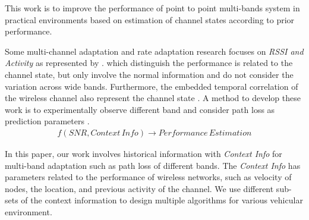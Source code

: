 

	  This work is to improve the performance of point to point multi-bands system in practical environments based on estimation of channel states according to prior performance.


	  Some multi-channel adaptation and rate adaptation research focuses on \emph{RSSI and Activity} as represented by \cite{cordeiro2007c,MOAR}. 
	  which distinguish the performance is related to the channel state, but only involve the normal information and do not consider the variation across wide bands. 
	  Furthermore, the embedded temporal correlation of the wireless channel also represent the channel state \cite{liuastra}. 
	  A method to develop these work is to experimentally observe different band and consider path loss as prediction parameters \cite{yucek2009survey}.
	  \begin{align}
	  \label{euqation:performance estimation}
	  f(SNR,Context\, Info) \rightarrow Performance\, Estimation
	  \end{align}

	  In this paper, our work involves historical information with \emph{Context Info} for multi-band adaptation such as path loss of different bands.
	  The \emph{Context Info} has parameters related to the performance of wireless networks, such as velocity of nodes, the location, and previous activity of the channel.
	  We use different sub-sets of the context information to design multiple algorithms for various vehicular environment. 


